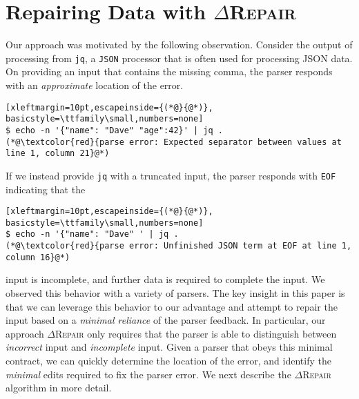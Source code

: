 \documentclass[acmsmall,screen,review,anonymous]{acmart}
\newcommand{\approach}{\textsc{$\Delta$Repair}\xspace}
\newcommand{\drepair}{\approach}
\def\<#1>{\texttt{#1}}
\begin{document}
\section{Repairing Data with \approach}
\label{sec:drepair}
Our approach was motivated by the following observation. Consider the output of processing
from \<jq>, a \<JSON> processor that is often used for processing JSON data.
On providing an input that contains the missing comma, the parser responds with an
\emph{approximate} location of the error.
\begin{lstlisting}[xleftmargin=10pt,escapeinside={(*@}{@*)}, basicstyle=\ttfamily\small,numbers=none]
$ echo -n '{"name": "Dave" "age":42}' | jq .
(*@\textcolor{red}{parse error: Expected separator between values at line 1, column 21}@*)
\end{lstlisting}
If we instead provide \<jq> with a truncated input,
the parser responds with \<EOF> 
 indicating that the
\begin{lstlisting}[xleftmargin=10pt,escapeinside={(*@}{@*)}, basicstyle=\ttfamily\small,numbers=none]
$ echo -n '{"name": "Dave" ' | jq .
(*@\textcolor{red}{parse error: Unfinished JSON term at EOF at line 1, column 16}@*)
\end{lstlisting}
input is incomplete,
and further data is required to complete the input. We observed this behavior with a variety of
parsers.
The key insight in this paper is that we can leverage this behavior to our advantage and
attempt to repair the input based on a \emph{minimal reliance} of the parser feedback.
In particular, our approach \drepair only requires that the parser is able to distinguish
between \emph{incorrect} input and \emph{incomplete} input. Given a parser that obeys this
minimal contract, we can quickly determine the location of the error, and identify the
\emph{minimal} edits required to fix the parser error.
We next describe the \drepair algorithm in more detail.
\end{document}
